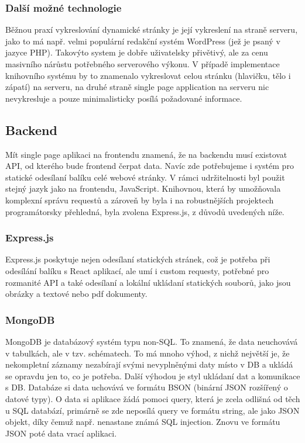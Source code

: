 \subsubsection{Další možné technologie}
Běžnou praxí vykreslování dynamické stránky je její vykreslení na straně serveru,
jako to má např. velmi populární redakční systém WordPress (jež je psaný v jazyce PHP).
Takovýto system je dobře uživatelsky přivětivý, ale za cenu masivního nárůstu
potřebného serverového výkonu.
V případě implementace knihovního systému by to znamenalo vykreslovat
celou stránku (hlavičku, tělo i zápatí) na serveru,
na druhé straně single page application na serveru nic nevykresluje a
pouze minimalisticky posílá požadované informace.


\subsection{Backend}
Mít single page aplikaci na frontendu znamená, že na backendu musí existovat API,
od kterého bude frontend čerpat data.
Navíc zde potřebujeme i systém pro statické odesílaní balíku celé webové stránky.
V rámci udržitelnosti byl použit stejný jazyk jako na frontendu, JavaScript.
Knihovnou, která by umožňovala komplexní správu requestů a zároveň by byla
i na robustnějších projektech programátorsky přehledná, byla zvolena Express.js,
z důvodů uvedených níže.

\subsubsection{Express.js}
Express.js poskytuje nejen odesílaní statických stránek,
což je potřeba při odesílání balíku s React aplikací, ale umí i
custom requesty, potřebné pro rozmanité API a také odesílaní a
lokální ukládaní statických souborů, jako jsou obrázky a textové nebo pdf dokumenty.

\subsubsection{MongoDB}
MongoDB je databázový systém typu non-SQL.
To znamená, že data neuchovává v tabulkách, ale v tzv. schématech.
To má mnoho výhod, z nichž největší je, že nekompletní záznamy nezabírají
svými nevyplněnými daty místo v DB a ukládá se opravdu jen to, co je potřeba.
Další výhodou je styl ukládaní dat a komunikace s DB.
Databáze si data uchovává ve formátu BSON (binární JSON rozšířený o datové typy).
O data si aplikace žádá pomoci query,
která je zcela odlišná od těch u SQL databází,
primárně se zde neposílá query ve formátu string, ale jako JSON objekt,
díky čemuž např. nenastane známá SQL injection.
Znovu ve formátu JSON poté data vrací aplikaci.

